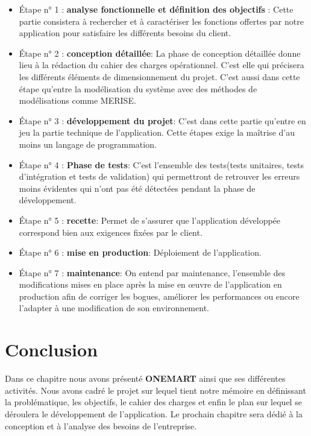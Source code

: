 	\begin{itemize}
		\item Étape n° 1 : \textbf{analyse fonctionnelle et définition des objectifs} : Cette partie consistera à rechercher et à caractériser les fonctions offertes par notre application pour satisfaire les différents besoins du client.\\
		\item Étape n° 2 : \textbf{conception détaillée}: La phase de conception détaillée donne lieu à la rédaction du cahier des charges opérationnel. C'est elle qui précisera les différents éléments de dimensionnement du projet.\cite{planification} C'est aussi dans cette étape qu'entre la modélisation du système avec des méthodes de modélisations comme MERISE.\\
		\item Étape n° 3 : \textbf{développement du projet}: C'est dans cette  partie qu'entre en jeu la partie technique de l'application. Cette étapes exige la maîtrise d'au moins un langage de programmation.\\
		\item Étape n° 4 : \textbf{Phase de tests}:
		C'est l'ensemble des tests(tests unitaires, tests d'intégration et tests de validation) qui permettront de retrouver les erreurs moins évidentes qui n'ont pas été détectées pendant la phase de développement.\\
		\item Étape n° 5 : \textbf{recette}: Permet de s'assurer que l'application développée correspond bien aux exigences fixées par le client.\\
		\item Étape n° 6 : \textbf{mise en production}: Déploiement de l'application.\\
		\item Étape n° 7 : \textbf{maintenance}: On entend par maintenance, l'ensemble des modifications mises en place après la mise en œuvre de l'application en production afin de corriger les bogues, améliorer les performances ou encore l'adapter à une modification de son environnement.\cite{planification}
	\end{itemize}
	
\section{Conclusion}
	Dans ce chapitre nous avons présenté \textbf{ONEMART} ainsi que ses différentes activités. Nous avons cadré le projet sur lequel tient notre mémoire en définissant la problématique, les objectifs, le cahier des charges et enfin le plan sur lequel se déroulera le développement de l'application. Le prochain chapitre sera dédié à la conception et à l'analyse des besoins de l'entreprise.